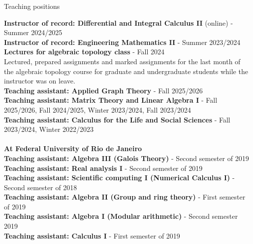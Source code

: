 \documentclass[12pt]{resume} %
\begin{document}


\begin{rSection}{Teaching positions}

    {\bf Instructor of record: Differential and Integral Calculus II} (online) - Summer 2024/2025
    \\
    {\bf Instructor of record: Engineering Mathematics II} - Summer 2023/2024
    \\
    {\bf Lectures for algebraic topology class} - Fall 2024
    \\
    Lectured, prepared assignments and marked assignments for the last month of the algebraic topology course for graduate and undergraduate students while the instructor was on leave.
    \\
    {\bf Teaching assistant: Applied Graph Theory} - Fall 2025/2026 
    \\
    {\bf Teaching assistant: Matrix Theory and Linear Algebra I} - Fall 2025/2026, Fall 2024/2025, Winter 2023/2024, Fall 2023/2024 
    \\
    {\bf Teaching assistant: Calculus for the Life and Social Sciences} - Fall 2023/2024, Winter 2022/2023
    \\
    \\
    {\bf \large{At Federal University of Rio de Janeiro}}
    \\[1mm]
    {\bf Teaching assistant: Algebra III (Galois Theory)} - Second semester of 2019
    \\
    {\bf Teaching assistant: Real analysis I} - Second semester of 2019 
    \\
    {\bf Teaching assistant: Scientific computing I (Numerical Calculus I)} - Second semester of 2018
    \\
    {\bf Teaching assistant: Algebra II (Group and ring theory)} - First semester of 2019
    \\
    {\bf Teaching assistant: Algebra I (Modular arithmetic)} - Second semester 2019
    \\
    {\bf Teaching assistant: Calculus I} - First semester of 2019
\end{rSection}
 
\end{document}
